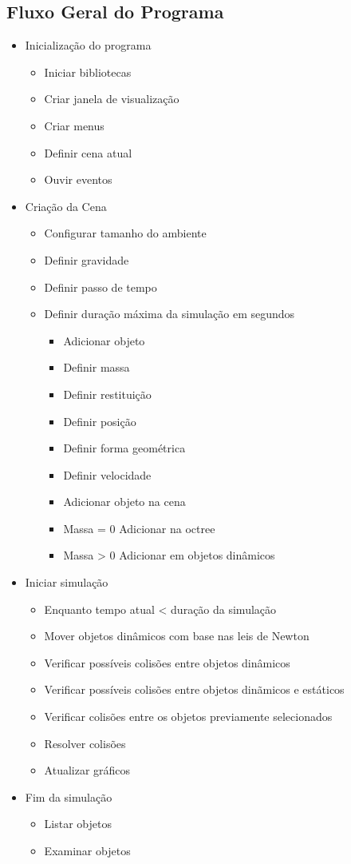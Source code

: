 \subsection{Fluxo Geral do Programa}
\begin{itemize}
\item Inicialização do programa
\begin{itemize}
\item Iniciar bibliotecas
\item Criar janela de visualização
\item Criar menus
\item Definir cena atual
\item Ouvir eventos
\end{itemize}
\item Criação da Cena
\begin{itemize}
\item Configurar tamanho do ambiente
\item Definir gravidade
\item Definir passo de tempo
\item Definir duração máxima da simulação em segundos
\begin{itemize}
\item Adicionar objeto
\item Definir massa
\item Definir restituição
\item Definir posição
\item Definir forma geométrica
\item Definir velocidade
\end{itemize}
\begin{itemize}
\item Adicionar objeto na cena
\item Massa = 0 Adicionar na octree
\item Massa > 0 Adicionar em objetos dinâmicos
\end{itemize}
\end{itemize}
\item Iniciar simulação
\begin{itemize}
\item Enquanto tempo atual < duração da simulação
\item Mover objetos dinâmicos com base nas leis de Newton
\item Verificar possíveis colisões entre objetos dinâmicos
\item Verificar possíveis colisões entre objetos dinãmicos e estáticos
\item Verificar colisões entre os objetos previamente selecionados
\item Resolver colisões
\item Atualizar gráficos
\end{itemize}
\item Fim da simulação
\begin{itemize}
\item Listar objetos
\item Examinar objetos
\end{itemize}
\end{itemize}

